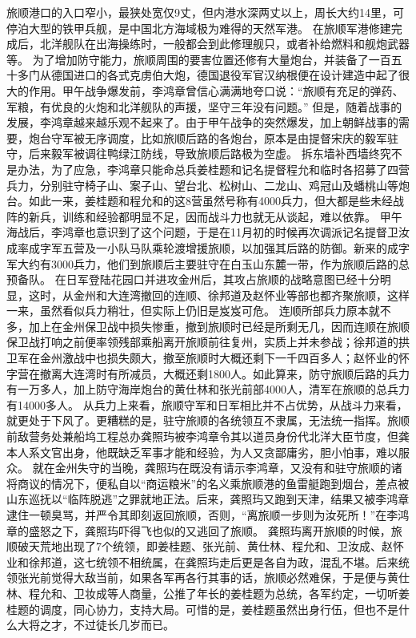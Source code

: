 \documentclass[12pt,UTF8]{ctexbook}
\begin{document}
旅顺港口的入口窄小，最狭处宽仅9丈，但内港水深两丈以上，周长大约14里，可停泊大型的铁甲兵舰，是中国北方海域极为难得的天然军港。
在旅顺军港修建完成后，北洋舰队在出海操练时，一般都会到此修理舰只，或者补给燃料和舰炮武器等。
为了增加防守能力，旅顺周围的要害位置还修有大量炮台，并装备了一百五十多门从德国进口的各式克虏伯大炮，德国退役军官汉纳根便在设计建造中起了很大的作用。甲午战争爆发前，李鸿章曾信心满满地夸口说：“旅顺有充足的弹药、军粮，有优良的火炮和北洋舰队的声援，坚守三年没有问题。”
但是，随着战事的发展，李鸿章越来越乐观不起来了。由于甲午战争的突然爆发，加上朝鲜战事的需要，炮台守军被无序调度，比如旅顺后路的各炮台，原本是由提督宋庆的毅军驻守，后来毅军被调往鸭绿江防线，导致旅顺后路极为空虚。
拆东墙补西墙终究不是办法，为了应急，李鸿章只能命总兵姜桂题和记名提督程允和临时各招募了四营兵力，分别驻守椅子山、案子山、望台北、松树山、二龙山、鸡冠山及蟠桃山等炮台。如此一来，姜桂题和程允和的这8营虽然号称有4000兵力，但大都是些未经战阵的新兵，训练和经验都明显不足，因而战斗力也就无从谈起，难以依靠。
甲午海战后，李鸿章也意识到了这个问题，于是在11月初的时候再次调派记名提督卫汝成率成字军五营及一小队马队乘轮渡增援旅顺，以加强其后路的防御。新来的成字军大约有3000兵力，他们到旅顺后主要驻守在白玉山东麓一带，作为旅顺后路的总预备队。
在日军登陆花园口并进攻金州后，其攻占旅顺的战略意图已经十分明显，这时，从金州和大连湾撤回的连顺、徐邦道及赵怀业等部也都齐聚旅顺，这样一来，虽然看似兵力稍壮，但实际上仍旧是岌岌可危。
连顺所部兵力原本就不多，加上在金州保卫战中损失惨重，撤到旅顺时已经是所剩无几，因而连顺在旅顺保卫战打响之前便率领残部乘船离开旅顺前往复州，实质上并未参战；徐邦道的拱卫军在金州激战中也损失颇大，撤至旅顺时大概还剩下一千四百多人；赵怀业的怀字营在撤离大连湾时有所减员，大概还剩1800人。如此算来，防守旅顺后路的兵力有一万多人，加上防守海岸炮台的黄仕林和张光前部4000人，清军在旅顺的总兵力有14000多人。
从兵力上来看，旅顺守军和日军相比并不占优势，从战斗力来看，就更处于下风了。更糟糕的是，驻守旅顺的各统领互不隶属，无法统一指挥。旅顺前敌营务处兼船坞工程总办龚照玙被李鸿章令其以道员身份代北洋大臣节度，但龚本人系文官出身，他既缺乏军事才能和经验，为人又贪鄙庸劣，胆小怕事，难以服众。
就在金州失守的当晚，龚照玙在既没有请示李鸿章，又没有和驻守旅顺的诸将商议的情况下，便私自以“商运粮米”的名义乘旅顺港的鱼雷艇跑到烟台，差点被山东巡抚以“临阵脱逃”之罪就地正法。后来，龚照玙又跑到天津，结果又被李鸿章逮住一顿臭骂，并严令其即刻返回旅顺，否则，“离旅顺一步则为汝死所！”在李鸿章的盛怒之下，龚照玙吓得飞也似的又逃回了旅顺。
龚照玙离开旅顺的时候，旅顺破天荒地出现了7个统领，即姜桂题、张光前、黄仕林、程允和、卫汝成、赵怀业和徐邦道，这七统领不相统属，在龚照玙走后更是各自为政，混乱不堪。后来统领张光前觉得大敌当前，如果各军再各行其事的话，旅顺必然难保，于是便与黄仕林、程允和、卫妆成等人商量，公推了年长的姜桂题为总统，各军约定，一切听姜桂题的调度，同心协力，支持大局。可惜的是，姜桂题虽然出身行伍，但也不是什么大将之才，不过徒长几岁而已。
\end{document}
